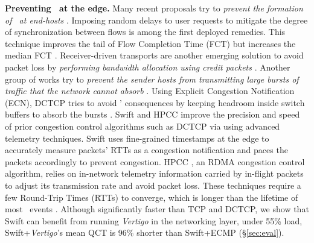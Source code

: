 \textbf{Preventing \bursts \ at the edge.}
Many recent proposals try to \emph{prevent the formation of \bursts\ at end-hosts} \cite{jitter, pHost, homa, dctcp, swift, tlt}. Imposing random delays to user requests to mitigate the degree of synchronization between flows \cite{jitter} is among the first deployed remedies. This technique improves the tail of Flow Completion Time (FCT) but increases the median FCT \cite{dctcp}.
%
Receiver-driven transports are another emerging solution to avoid packet loss by \textit{performing bandwidth allocation using credit packets} \cite{homa, expresspass, aeolus, pHost}. 
Another group of works try to \textit{prevent the sender hosts from transmitting large bursts of traffic that the network cannot absorb} \cite{dctcp, hpcc, swift}. Using Explicit Congestion Notification (ECN), DCTCP tries to avoid \bursts' consequences by keeping headroom inside switch buffers to absorb the bursts \cite{dctcp}. Swift \cite{swift} and HPCC \cite{hpcc} improve the precision and speed of prior congestion control algorithms such as DCTCP via using advanced telemetry techniques. Swift uses fine-grained timestamps at the edge to accurately measure packets' RTTs as a congestion notification and paces the packets accordingly to prevent congestion. HPCC \cite{hpcc}, an RDMA congestion control algorithm, relies on in-network telemetry information carried by in-flight packets to adjust its transmission rate and avoid packet loss. 
These techniques require a few Round-Trip Times (RTTs) to converge, which is longer than the lifetime of most \burst\ events \cite{high-resolution}.
Although significantly faster than TCP and DCTCP, we show that Swift can benefit from running \textit{Vertigo} in the networking layer, \eg under 55\% load, Swift+\textit{Vertigo}'s mean QCT is 96\% shorter than Swift+ECMP (\S\ref{sec:eval}).

